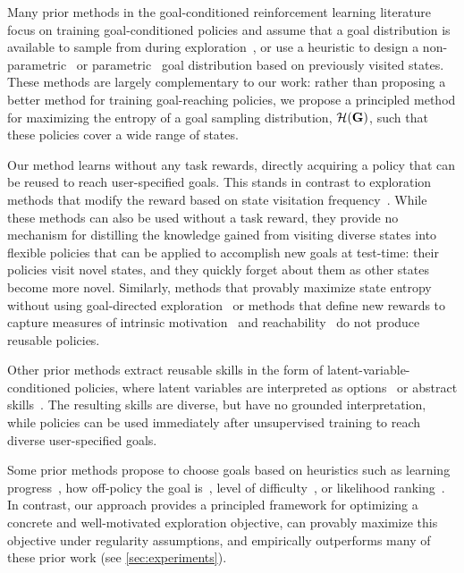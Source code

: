 Many prior methods in the goal-conditioned reinforcement learning literature focus on training goal-conditioned policies and assume that a goal distribution is available to sample from during exploration~\citep{kaelbling1993goals,schaul2015uva,andrychowicz2017her,pong2018tdm}, or use a heuristic to design a non-parametric~\citep{colas2018gep,wardefarley2018discern,florensa2018selfsupervised} or parametric~\citep{pere2018unsupervised,nair2018rig} goal distribution based on previously visited states.
These methods are largely complementary to our work:
rather than proposing a better method for training goal-reaching policies, we propose a principled method for maximizing the entropy of a goal sampling distribution, ${\mathcal{H}}(\mathbf{G})$, such that these policies cover a wide range of states.

Our method learns without any task rewards, directly acquiring a policy that can be reused to reach user-specified goals.
This stands in contrast to exploration methods that modify the reward based on state visitation frequency~\citep{bellemare2016unifying,ostrovski2017count,tang2017hashtag,chentanez2005intrinsically,lopes2012exploration,stadie2016exploration,pathak2017curiosity,burda2018exploration,burda2018large,mohamed2015variational,tang2017hashtag,fu2017ex2}.
While these methods can also be used without a task reward, they provide no mechanism for distilling the knowledge gained from visiting diverse states into flexible policies that can be applied to accomplish new goals at test-time: their policies visit novel states, and they quickly forget about them as other states become more novel.
Similarly, methods that provably maximize state entropy without using goal-directed exploration~\citep{hazan2019provably} or methods that define new rewards to capture measures of intrinsic motivation~\citep{mohamed2015variational} and reachability~\citep{savinov2018episodic} do not produce reusable policies.

Other prior methods extract reusable skills in the form of latent-variable-conditioned policies, where
latent variables are interpreted as options~\citep{sutton1999between} or abstract skills~\citep{hausman2018skillembedding,gupta2018structuredexploration,eysenbach2018diayn,gupta2018unsupervised,florensa2017stochastic}.
The resulting skills are diverse, but have no grounded interpretation, while \METHOD policies can be used immediately after unsupervised training to reach diverse user-specified goals.

Some prior methods propose to choose goals based on heuristics such as learning progress~\citep{baranes2012, veeriah2018many, colas2018curious}, how off-policy the goal is~\citep{nachum2018hiro}, level of difficulty~\citep{held2018goalgan}, or likelihood ranking~\citep{zhao2019rankweight}.
In contrast, our approach provides a principled framework for optimizing a concrete and well-motivated exploration objective, can provably maximize this objective under regularity assumptions, and empirically outperforms many of these prior work (see \autoref{sec:experiments}).